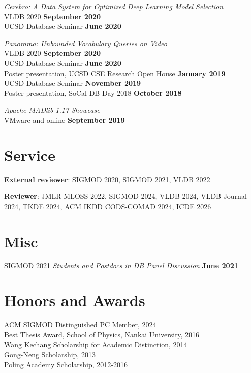 \documentclass[margin,line]{res}
\begin{document}
\begin{resume}
\vspace{-3mm}
\textit{Cerebro: A Data System for Optimized Deep Learning Model Selection}\\
VLDB 2020 \hfill {\bf September 2020}\\
UCSD Database Seminar \hfill {\bf June 2020}

\vspace{-3mm}
\textit{Panorama: Unbounded Vocabulary Queries on Video}\\
VLDB 2020 \hfill {\bf September 2020}\\
UCSD Database Seminar \hfill {\bf June 2020}\\
Poster presentation, UCSD CSE Research Open House \hfill {\bf January 2019}\\
UCSD Database Seminar \hfill {\bf November 2019}\\
Poster presentation, SoCal DB Day 2018 \hfill {\bf October 2018}

\vspace{-3mm}
\textit{Apache MADlib 1.17 Showcase}\\
VMware and online \hfill {\bf September 2019}\\


\section{\sc Service}

\textbf{External reviewer}: SIGMOD 2020, SIGMOD 2021, VLDB 2022

\textbf{Reviewer}: JMLR MLOSS 2022, SIGMOD 2024, VLDB 2024, VLDB Journal 2024, TKDE 2024, ACM IKDD CODS-COMAD 2024, ICDE 2026


\section{\sc Misc}

SIGMOD 2021 \textit{Students and Postdocs in DB Panel Discussion} \hfill {\bf June 2021}


\section{\sc Honors and Awards} 
ACM SIGMOD Distinguished PC Member, 2024\\
Best Thesis Award, School of Physics, Nankai University, 2016\\
Wang Kechang Scholarship for Academic Distinction, 2014\\
Gong-Neng Scholarship, 2013\\
Poling Academy Scholarship, 2012-2016



\end{resume}
\end{document}
